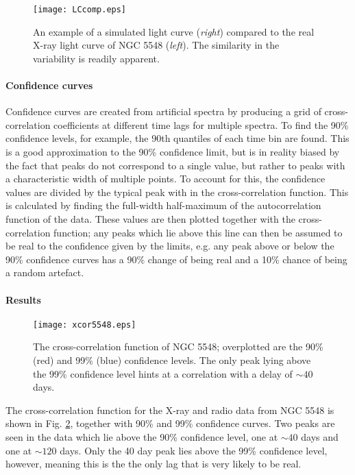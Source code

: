 \documentclass[letters,useAMS,usenatbib]{samnote}
\begin{document}
 \begin{figure}
	\texttt{[image: LCcomp.eps]}

	\caption{An example of a simulated light curve ({\it right}) compared to the real X-ray light curve of NGC 5548 ({\it left}). The similarity in the variability
is readily apparent.}
	\label{xcor}
\end{figure}
 

\paragraph{Confidence curves}

 Confidence curves are created from artificial spectra by producing a grid of cross-correlation coefficients at different time lags for multiple spectra. To find the 90\%
confidence levels, for example, the 90th quantiles of each time bin are found. This is a good approximation to the 90\% confidence limit, but is in reality biased by
the fact that peaks do not correspond to a single value, but rather to peaks with a characteristic width of multiple points. To account for this, the confidence values
are divided by the typical peak with in the cross-correlation function. This is calculated by finding the full-width half-maximum of the autocorrelation function of the
data. These values are then plotted together with the cross-correlation function; any peaks  which lie above this line can then be assumed to be real to the confidence
given by the limits, e.g. any peak above or below the 90\% confidence curves has a 90\% change of being real and a 10\% chance of being a random artefact.
 
 \paragraph{Results}
 
 \begin{figure}
	\texttt{[image: xcor5548.eps]}

	\caption{The cross-correlation function of NGC 5548; overplotted are the 90\% (red) and 99\% (blue) confidence levels. The only peak
	lying above the 99\% confidence level hints at a correlation with a delay of $\sim 40$ days.}
	\label{xcor}
\end{figure}
 
 The cross-correlation function for the X-ray and radio data from NGC 5548 is shown in Fig. \ref{xcor}, together with 90\% and 99\% confidence curves. Two peaks are seen
in the data which lie above the 90\% confidence level, one at $\sim 40$ days and one at $\sim 120$ days. Only the 40 day peak lies above the 99\% confidence level,
however, meaning this is the the only lag that is very likely to be real. 
 
\end{document}
